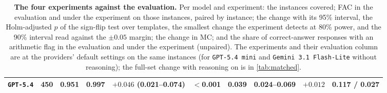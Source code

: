 \begin{table}[t]
{\begin{tabular}{l r r r c r r c r c}
\texttt{GPT-5.4} & 450 & 0.951 & 0.997 & $+0.046$ (0.021--0.074) & $<$0.001 & 0.039 & 0.024--0.069 & $+0.012$ & 0.117 / 0.027 \\
\bottomrule
\end{tabular}
}
\caption{\textbf{The four experiments against the evaluation.} Per model and experiment: the
instances covered; FAC in the evaluation and under the experiment on those instances, paired by
instance; the change with its 95\% interval, the Holm-adjusted $p$ of the sign-flip test over
templates, the smallest change the experiment detects at 80\% power, and the 90\% interval read
against the $\pm 0.05$ margin; the change in MC; and the share of correct-answer responses with an
arithmetic flag in the evaluation and under the experiment (unpaired). The experiments and their
evaluation column are at the providers' default settings on the same instances (for
\texttt{GPT-5.4 mini} and \texttt{Gemini 3.1 Flash-Lite} without reasoning); the full-set change
with reasoning on is in \autoref{tab:matched}.}
\label{tab:experiments}
\end{table}
